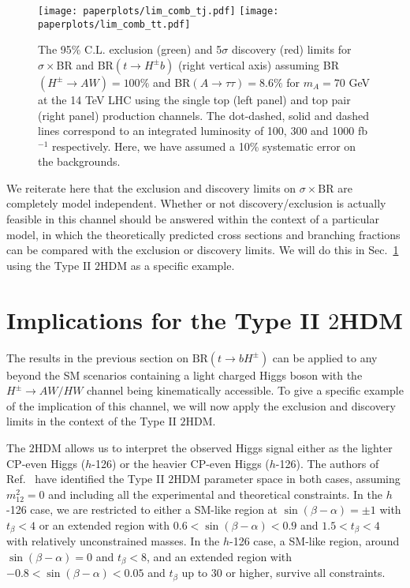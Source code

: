  \begin{figure}[h!]
 \centering
 	\texttt{[image: paperplots/lim\_comb\_tj.pdf]} \hspace{0.2 in}
 	\texttt{[image: paperplots/lim\_comb\_tt.pdf]}
\caption{The 95\% C.L. exclusion (green) and 5$\sigma$ discovery (red) limits for $\sigma \times $BR and BR$(t \rightarrow H^{\pm} b)$ (right vertical axis) assuming BR$(H^{\pm} \rightarrow A W)=100\%$ and BR$(A \rightarrow \tau\tau)=8.6\%$ for $m_A = 70$ GeV at the 14 TeV LHC using the single top (left panel) and top pair (right panel) production channels. The dot-dashed, solid and dashed lines correspond to an integrated luminosity of 100, 300 and 1000 fb$^{-1}$ respectively. Here, we have assumed a 10\% systematic error on the backgrounds. } 
\label{fig:ana_limits}
\end{figure}

 

We reiterate here that the exclusion and discovery limits on $\sigma \times \text{BR}$ are completely model independent. Whether or not discovery/exclusion is actually feasible in this channel should be answered within the context of a particular model, in which the theoretically predicted cross sections and branching fractions can be compared with the exclusion or discovery limits. We will do this in Sec.~\ref{sec:implication} using the Type II $2$HDM as a specific example. 

\section{Implications for the Type II $2$HDM}
 \label{sec:implication}

 The results in the previous section on $\text{BR}(t \rightarrow b H^{\pm})$ can be applied to any beyond the SM scenarios containing a light charged Higgs boson with the $H^{\pm} \rightarrow AW/HW$ channel being kinematically accessible. To give a specific example of the implication of this channel, we will now apply the exclusion and discovery limits in the context of the Type II $2$HDM. 

 The $2$HDM allows us to interpret the observed Higgs signal either as the lighter CP-even Higgs ($h$-126) or the heavier CP-even Higgs ($h$-126). The authors of Ref.~\cite{Coleppa:2013dya} have identified the Type II $2$HDM parameter space in both cases, assuming $m_{12}^2=0$ and including all the experimental and theoretical constraints. In the $h$-126 case, we are restricted to either a SM-like region at $\sin(\beta-\alpha)=\pm1$ with $t_{\beta}<4$ or an extended region with $0.6<\sin(\beta-\alpha)<0.9$ and $1.5<t_{\beta}<4$ with relatively unconstrained masses. In the $h$-126 case, a SM-like region, around $\sin(\beta-\alpha)=0$ and $t_{\beta}<8$, and an extended region with $-0.8 < \sin(\beta-\alpha)<0.05$ and $t_{\beta}$ up to 30 or higher, survive all constraints. 
 

